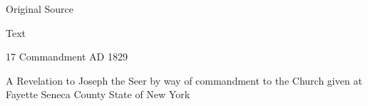 			\begin{description}
				\item[Original Source]
			\end{description}
			
			
			\begin{description}
				\item[Text]
			\end{description}
			
				\begin{tightcenter}
				17 Commandment AD 1829
				\end{tightcenter}
				
				A Revelation to Joseph the Seer by way of commandment to the Church given at Fayette Seneca County State of New York
				
